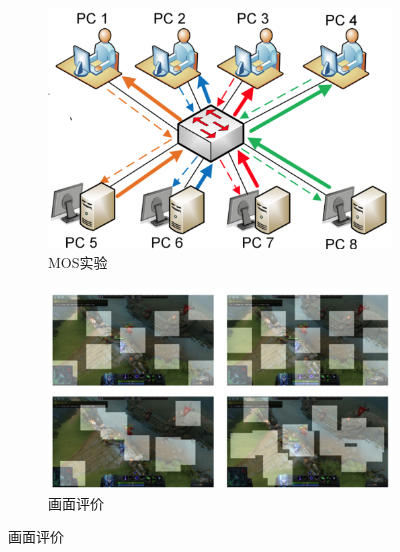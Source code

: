 \begin{figure}[ht]
\centering
\begin{subfigure}[t]{0.48\linewidth} 
  \centering
  \includegraphics[height=0.2\textheight]{figures/chap02/qoe_related/MOS.png} %
  \caption{MOS实验}
\end{subfigure}%
\begin{subfigure}[t]{0.48\linewidth} 
  \centering
  \includegraphics[height=0.2\textheight]{figures/chap02/qoe_related/VMAF.png} %
  \caption{画面评价}
\end{subfigure}


\end{figure}
